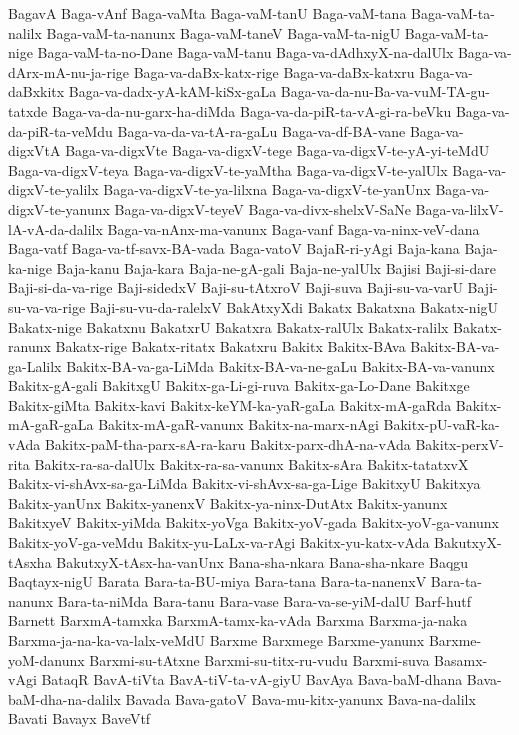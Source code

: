 {BagavA
Baga-vAnf
Baga-vaMta
Baga-vaM-tanU
Baga-vaM-tana
Baga-vaM-ta-nalilx
Baga-vaM-ta-nanunx
Baga-vaM-taneV
Baga-vaM-ta-nigU
Baga-vaM-ta-nige
Baga-vaM-ta-no-Dane
Baga-vaM-tanu
Baga-va-dAdhxyX-na-dalUlx
Baga-va-dArx-mA-nu-ja-rige
Baga-va-daBx-katx-rige
Baga-va-daBx-katxru
Baga-va-daBxkitx
Baga-va-dadx-yA-kAM-kiSx-gaLa
Baga-va-da-nu-Ba-va-vuM-TA-gu-tatxde
Baga-va-da-nu-garx-ha-diMda
Baga-va-da-piR-ta-vA-gi-ra-beVku
Baga-va-da-piR-ta-veMdu
Baga-va-da-va-tA-ra-gaLu
Baga-va-df-BA-vane
Baga-va-digxVtA
Baga-va-digxVte
Baga-va-digxV-tege
Baga-va-digxV-te-yA-yi-teMdU
Baga-va-digxV-teya
Baga-va-digxV-te-yaMtha
Baga-va-digxV-te-yalUlx
Baga-va-digxV-te-yalilx
Baga-va-digxV-te-ya-lilxna
Baga-va-digxV-te-yanUnx
Baga-va-digxV-te-yanunx
Baga-va-digxV-teyeV
Baga-va-divx-shelxV-SaNe
Baga-va-lilxV-lA-vA-da-dalilx
Baga-va-nAnx-ma-vanunx
Baga-vanf
Baga-va-ninx-veV-dana
Baga-vatf
Baga-va-tf-savx-BA-vada
Baga-vatoV
BajaR-ri-yAgi
Baja-kana
Baja-ka-nige
Baja-kanu
Baja-kara
Baja-ne-gA-gali
Baja-ne-yalUlx
Bajisi
Baji-si-dare
Baji-si-da-va-rige
Baji-sidedxV
Baji-su-tAtxroV
Baji-suva
Baji-su-va-varU
Baji-su-va-va-rige
Baji-su-vu-da-ralelxV
BakAtxyXdi
Bakatx
Bakatxna
Bakatx-nigU
Bakatx-nige
Bakatxnu
BakatxrU
Bakatxra
Bakatx-ralUlx
Bakatx-ralilx
Bakatx-ranunx
Bakatx-rige
Bakatx-ritatx
Bakatxru
Bakitx
Bakitx-BAva
Bakitx-BA-va-ga-Lalilx
Bakitx-BA-va-ga-LiMda
Bakitx-BA-va-ne-gaLu
Bakitx-BA-va-vanunx
Bakitx-gA-gali
BakitxgU
Bakitx-ga-Li-gi-ruva
Bakitx-ga-Lo-Dane
Bakitxge
Bakitx-giMta
Bakitx-kavi
Bakitx-keYM-ka-yaR-gaLa
Bakitx-mA-gaRda
Bakitx-mA-gaR-gaLa
Bakitx-mA-gaR-vanunx
Bakitx-na-marx-nAgi
Bakitx-pU-vaR-ka-vAda
Bakitx-paM-tha-parx-sA-ra-karu
Bakitx-parx-dhA-na-vAda
Bakitx-perxV-rita
Bakitx-ra-sa-dalUlx
Bakitx-ra-sa-vanunx
Bakitx-sAra
Bakitx-tatatxvX
Bakitx-vi-shAvx-sa-ga-LiMda
Bakitx-vi-shAvx-sa-ga-Lige
BakitxyU
Bakitxya
Bakitx-yanUnx
Bakitx-yanenxV
Bakitx-ya-ninx-DutAtx
Bakitx-yanunx
BakitxyeV
Bakitx-yiMda
Bakitx-yoVga
Bakitx-yoV-gada
Bakitx-yoV-ga-vanunx
Bakitx-yoV-ga-veMdu
Bakitx-yu-LaLx-va-rAgi
Bakitx-yu-katx-vAda
BakutxyX-tAsxha
BakutxyX-tAsx-ha-vanUnx
Bana-sha-nkara
Bana-sha-nkare
Baqgu
Baqtayx-nigU
Barata
Bara-ta-BU-miya
Bara-tana
Bara-ta-nanenxV
Bara-ta-nanunx
Bara-ta-niMda
Bara-tanu
Bara-vase
Bara-va-se-yiM-dalU
Barf-hutf
Barnett
BarxmA-tamxka
BarxmA-tamx-ka-vAda
Barxma
Barxma-ja-naka
Barxma-ja-na-ka-va-lalx-veMdU
Barxme
Barxmege
Barxme-yanunx
Barxme-yoM-danunx
Barxmi-su-tAtxne
Barxmi-su-titx-ru-vudu
Barxmi-suva
Basamx-vAgi
BataqR
BavA-tiVta
BavA-tiV-ta-vA-giyU
BavAya
Bava-baM-dhana
Bava-baM-dha-na-dalilx
Bavada
Bava-gatoV
Bava-mu-kitx-yanunx
Bava-na-dalilx
Bavati
Bavayx
BaveVtf
}
